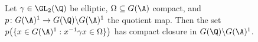 Let $\gamma\in\GL_2(\Q)$ be elliptic, $\Omega\subseteq G(\A)$ compact, and $p\colon G(\A)^1\to G(\Q)\backslash G(\A)^1$ the quotient map.
Then the set $p\bigl(\{x\in G(\A)^1:x^{-1}\gamma x\in\Omega\}\bigr)$ has compact closure in $G(\Q)\backslash G(\A)^1$.
